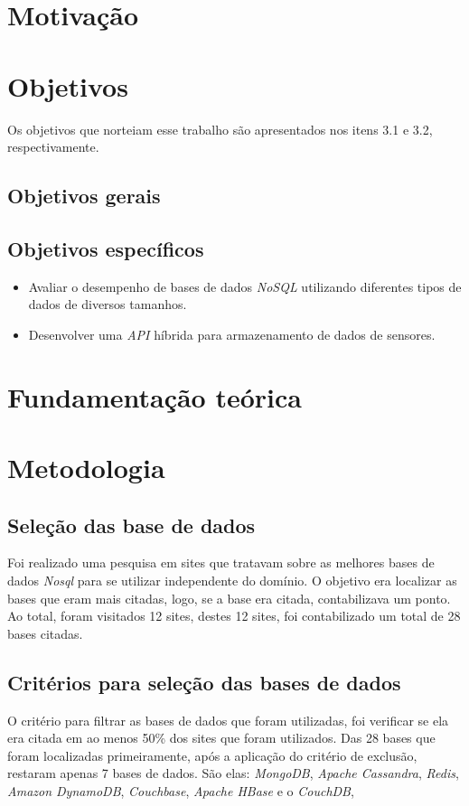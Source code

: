 \documentclass[12pt]{article}
\begin{document}
\section{Motivação} \label{sec:Motivação}


\section{Objetivos}
Os objetivos que norteiam esse trabalho são apresentados nos itens  3.1 e 3.2, respectivamente.


\subsection{Objetivos gerais}

\subsection{Objetivos específicos}
\begin{itemize}
   \item Avaliar o desempenho de bases de dados \textit{NoSQL} utilizando diferentes tipos de dados de diversos tamanhos.
   \item Desenvolver uma \textit{API} híbrida para armazenamento de dados de sensores.
 \end{itemize}



\section{Fundamentação teórica}


\section{Metodologia}
\subsection{Seleção das base de dados}
Foi realizado uma pesquisa em sites que tratavam sobre as melhores bases de dados \textit{Nosql} para se utilizar independente do domínio. O objetivo era localizar as bases que eram mais citadas, logo, se a base era citada, contabilizava um ponto. Ao total, foram visitados 12 sites, destes 12 sites, foi contabilizado um total de 28 bases citadas. 
\subsection{Critérios para seleção das bases de dados}
O critério para filtrar as bases de dados que foram utilizadas, foi verificar se ela era citada em ao menos 50\% dos sites que foram utilizados.  Das 28 bases que foram localizadas primeiramente, após a aplicação do critério de exclusão, restaram apenas 7 bases de dados. São elas: \textit{MongoDB}, \textit{Apache Cassandra}, \textit{Redis}, \textit{Amazon DynamoDB}, \textit{Couchbase}, \textit{Apache HBase} e o \textit{CouchDB},
\end{document}
